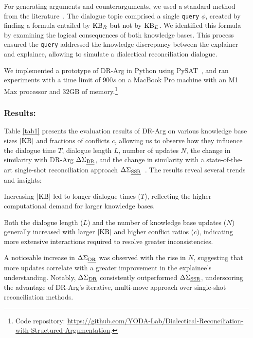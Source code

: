 \documentclass{article}
\begin{document}
For generating arguments and counterarguments, we used a standard method from the literature~\citep{besnard2010mus}. The dialogue topic comprised a single \texttt{query} $\phi$, created by finding a formula entailed by $\mathrm{KB}_R$ but not by $\mathrm{KB}_E$. We identified this formula by examining the logical consequences of both knowledge bases. This process ensured the \texttt{query} addressed the knowledge discrepancy between the explainer and explainee, allowing to simulate a dialectical reconciliation dialogue.

We implemented a prototype of DR-Arg in Python using PySAT~\citep{imms-sat18}, and ran experiments with a time limit of $900s$ on a MacBook Pro machine with an M1 Max processor and 32GB of memory.\footnote{Code repository: \url{https://github.com/YODA-Lab/Dialectical-Reconciliation-with-Structured-Argumentation}.}


\subsubsection{Results:} Table \ref{tab1} presents the evaluation results of DR-Arg on various knowledge base sizes $|\mathrm{KB}|$ and fractions of conflicts $c$, allowing us to observe how they influence the dialogue time $T$, dialogue length $L$, number of updates $N$, the change in similarity with DR-Arg $\Delta \Sigma_{\text{\emph{DR}}}$, and the change in similarity with a state-of-the-art single-shot reconciliation approach $\Delta \Sigma_{\text{\emph{SSR}}}$~\citep{vas21}. %
The results reveal several trends and insights:

\squishlist

\item  Increasing $|\mathrm{KB}|$ led to longer dialogue times ($T$), reflecting the higher computational demand for larger knowledge bases.


\item Both the dialogue length ($L$) and the number of knowledge base updates ($N$) generally increased with larger $|\mathrm{KB}|$ and higher conflict ratios ($c$), indicating more extensive interactions required to resolve greater inconsistencies.

\item A noticeable increase in $\Delta \Sigma_{\text{\emph{DR}}}$ was observed with the rise in $N$, suggesting that more updates correlate with a greater improvement in the explainee’s understanding. Notably, $\Delta \Sigma_{\text{\emph{DR}}}$ consistently outperformed $\Delta \Sigma_{\text{\emph{SSR}}}$, underscoring the advantage of DR-Arg's iterative, multi-move approach over single-shot reconciliation methods.
\end{document}
